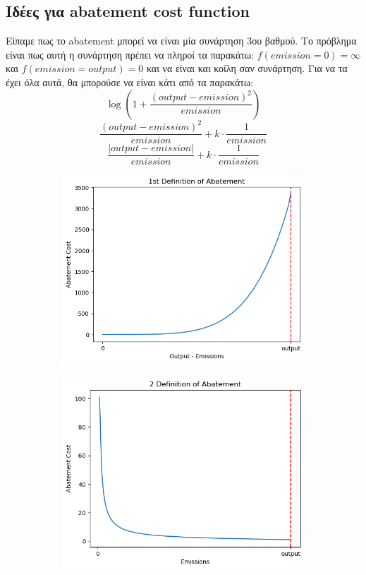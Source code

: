 \documentclass[a4paper,twoside,10pt]{article}
\begin{document}
\subsection{Ιδέες για abatement cost function}
Είπαμε πως το abatement μπορεί να είναι μία συνάρτηση 3ου βαθμού. Το πρόβλημα είναι πως αυτή η συνάρτηση πρέπει να πληροί τα παρακάτω:
$ f(emission = 0 ) = \infty $ και $ f(emission = output) = 0$ και να είναι και κοίλη σαν συνάρτηση. 
Για να τα έχει όλα αυτά, θα μπορούσε να είναι κάτι από τα παρακάτω:
$$ \log \left( 1 + \frac{(output - emission)^2}{emission} \right) $$
$$\frac{(output-emission)^2}{emission} + k\cdot\frac{1}{emission} $$
$$ \frac{|output-emission|}{emission} + k\cdot\frac{1}{emission}$$

\begin{figure}[H]
	\begin{subfigure}{.5\textwidth}
	\centering
	\includegraphics[width=0.7\linewidth]{images/definition_abatement_1}
	\caption{}
	\label{fig:definitionabatement1}
\end{subfigure}
	\begin{subfigure}{.5\textwidth}
	\centering
	\includegraphics[width=0.7\linewidth]{images/definition_abatement_2}
\end{subfigure}
	\caption{}
	\label{fig:definitionabatement2}
\end{figure}
\end{document}
